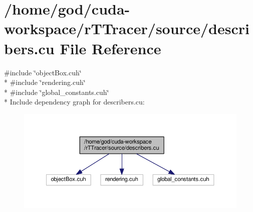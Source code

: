 \hypertarget{r_t_tracer_2source_2describers_8cu}{}\section{/home/god/cuda-\/workspace/r\+T\+Tracer/source/describers.cu File Reference}
\label{r_t_tracer_2source_2describers_8cu}
{\ttfamily \#include \char`\"{}object\+Box.\+cuh\char`\"{}}\\*
{\ttfamily \#include \char`\"{}rendering.\+cuh\char`\"{}}\\*
{\ttfamily \#include \char`\"{}global\+\_\+constants.\+cuh\char`\"{}}\\*
Include dependency graph for describers.\+cu\+:
\nopagebreak
\begin{figure}[H]
\begin{center}
\leavevmode
\includegraphics[width=350pt]{r_t_tracer_2source_2describers_8cu__incl}
\end{center}
\end{figure}
